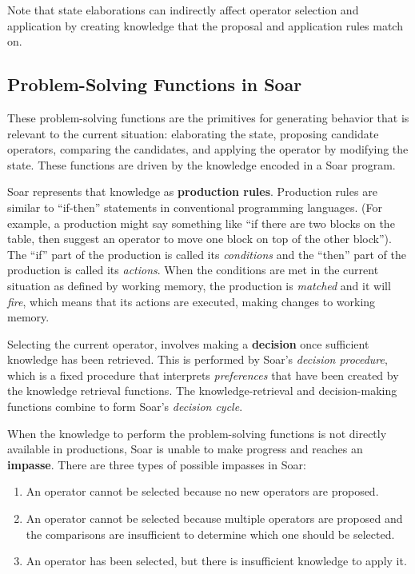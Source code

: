 Note that state elaborations can indirectly affect operator selection and application by creating knowledge that the proposal and application rules match on.

\subsection{Problem-Solving Functions in Soar}
\label{ARCH-functions}

These problem-solving functions are the primitives for generating behavior that is relevant to the current situation: elaborating the state, proposing candidate operators, comparing the candidates, and applying the operator by modifying the state. These functions are driven by the knowledge encoded in a Soar program.
 
Soar represents that knowledge as \textbf{production rules}. Production rules are similar to ``if-then'' statements in conventional programming languages. (For example, a production might say something like ``if there are two blocks on the table, then suggest an operator to move one block on top of the other block''). The ``if'' part of the production is called its \textit{conditions} and the ``then'' part of the production is called its \textit{actions}. When the conditions are met in the current situation as defined by working memory, the production is \emph{matched} and it will \emph{fire}, which means that its actions are executed, making changes to working memory.

Selecting the current operator, involves making a \textbf{decision} once sufficient knowledge has been retrieved. This is performed by Soar's \emph{decision procedure}, which is a fixed procedure that interprets \emph{preferences} that have been created by the knowledge retrieval functions. The knowledge-retrieval and decision-making functions combine to form Soar's \emph{decision cycle}.

When the knowledge to perform the problem-solving functions is not directly available in productions, Soar is unable to make progress and reaches an \textbf{impasse}.  There are three types of possible impasses in Soar:

\vspace{-8pt}
\begin{enumerate}
	\item An operator cannot be selected because no new operators are proposed.
	\vspace{-6pt}
	\item An operator cannot be selected because multiple operators are proposed and the comparisons are insufficient to determine which one should be selected.
	\vspace{-6pt}
	\item An operator has been selected, but there is insufficient knowledge to apply it.
	\vspace{-6pt}
\end{enumerate}

